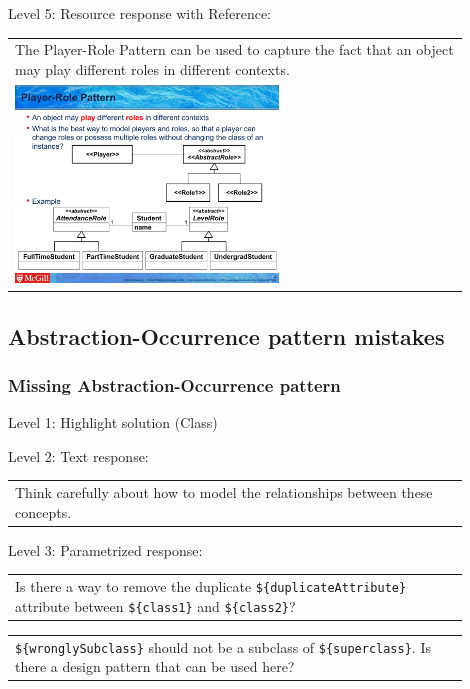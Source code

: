\noindent Level 5: Resource response with Reference: \medskip

\begin{tabular}{|p{0.9\linewidth}}
The Player-Role Pattern can be used to capture the fact that an object may play different roles
in different contexts.

\\
\includegraphics[width=0.6\textwidth]{images/player_role.png}
\end{tabular} \medskip


\subsection{Abstraction-Occurrence pattern mistakes}

\subsubsection{Missing Abstraction-Occurrence pattern}

\noindent Level 1: Highlight solution (Class) \medskip

\noindent Level 2: Text response: \medskip

\begin{tabular}{|p{0.9\linewidth}}
Think carefully about how to model the relationships between these concepts.
\end{tabular} \medskip

\noindent Level 3: Parametrized response: \medskip

\begin{tabular}{|p{0.9\linewidth}}
Is there a way to remove the duplicate \verb|${duplicateAttribute}| attribute between \verb|${class1}| and \verb|${class2}|?
\end{tabular} \medskip

\begin{tabular}{|p{0.9\linewidth}}
\verb|${wronglySubclass}| should not be a subclass of \verb|${superclass}|. Is there a design pattern that can be used here?
\end{tabular} \medskip


